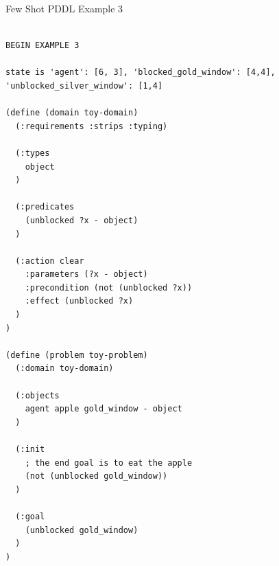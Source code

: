 \documentclass{article}
\theoremstyle{plain}
\theoremstyle{definition}
\theoremstyle{remark}
\begin{document}
\begin{mybox}[boxrule=0pt, parbox=false, opacityframe=1, colframe=black, label=box:few_shot_example_3_prompt]{Few Shot PDDL Example 3}
\begin{lstlisting}[basicstyle=\ttfamily\small, breaklines=true]

BEGIN EXAMPLE 3

state is 'agent': [6, 3], 'blocked_gold_window': [4,4], 'unblocked_silver_window': [1,4]

(define (domain toy-domain)
  (:requirements :strips :typing)
  
  (:types
    object
  )

  (:predicates
    (unblocked ?x - object)
  )

  (:action clear
    :parameters (?x - object)
    :precondition (not (unblocked ?x))
    :effect (unblocked ?x)
  )
)

(define (problem toy-problem)
  (:domain toy-domain)

  (:objects
    agent apple gold_window - object
  )

  (:init
    ; the end goal is to eat the apple
    (not (unblocked gold_window))
  )

  (:goal
    (unblocked gold_window)
  )
)


\end{lstlisting}
\end{mybox}
\end{document}
